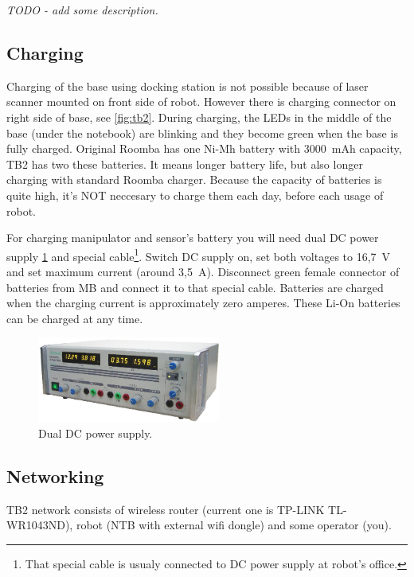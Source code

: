 \documentclass[12pt,a4paper,titlepage]{article}
\numberwithin{equation}{subsection}
\begin{document}
\emph{TODO - add some description.}


\subsection{Charging}

Charging of the base using docking station is not possible because of laser scanner mounted on front side of robot. However there is charging connector on right side of base, see \ref{fig:tb2}. During charging, the LEDs in the middle of the base (under the notebook) are blinking and they become green when the base is fully charged. Original Roomba has one Ni-Mh battery with 3000~mAh capacity, TB2 has two these batteries. It means longer battery life, but also longer charging with standard Roomba charger. Because the capacity of batteries is quite high, it's NOT neccesary to charge them each day, before each usage of robot.

For charging manipulator and sensor's battery you will need dual DC power supply \ref{fig:dc-supply} and special cable\footnote{That special cable is usualy connected to DC power supply at robot's office.}. Switch DC supply on, set both voltages to 16,7~V and set maximum current (around 3,5~A). Disconnect green female connector of batteries from MB and connect it to that special cable. Batteries are charged when the charging current is approximately zero amperes. These Li-On batteries can be charged at any time.

\begin{center}
 \begin{figure}[!h]
	\centering\includegraphics[width=6cm]{./img/dc-supply.jpg}
 \caption{Dual DC power supply.}
 \label{fig:dc-supply}
 \end{figure}
\end{center}

\subsection{Networking}

TB2 network consists of wireless router (current one is TP-LINK TL-WR1043ND), robot (NTB with external wifi dongle) and some operator (you).
\end{document}
